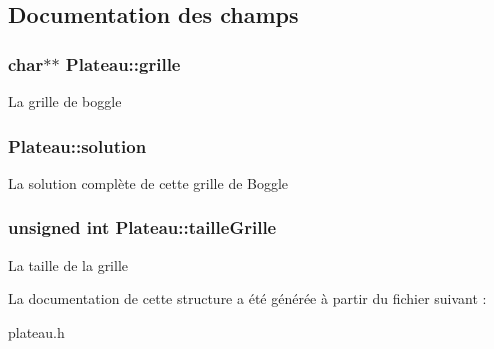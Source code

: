 \subsection{Documentation des champs}
\hypertarget{structPlateau_a42411aa44b78d298681030ce3461f686}{
\subsubsection[{grille}]{\setlength{\rightskip}{0pt plus 5cm}char$\ast$$\ast$ Plateau\-::grille}}\label{structPlateau_a42411aa44b78d298681030ce3461f686}
La grille de boggle \hypertarget{structPlateau_aed88af50891b17edcd3ba97d7098dfde}{
\subsubsection[{solution}]{ Plateau\-::solution}}\label{structPlateau_aed88af50891b17edcd3ba97d7098dfde}
La solution complète de cette grille de Boggle \hypertarget{structPlateau_aa71d603afaf91ff7c81427af61919a34}{
\subsubsection[{taille\-Grille}]{\setlength{\rightskip}{0pt plus 5cm}unsigned int Plateau\-::taille\-Grille}}\label{structPlateau_aa71d603afaf91ff7c81427af61919a34}
La taille de la grille 

La documentation de cette structure a été générée à partir du fichier suivant \-:\begin{DoxyCompactItemize}
\item 
plateau.\-h\end{DoxyCompactItemize}
